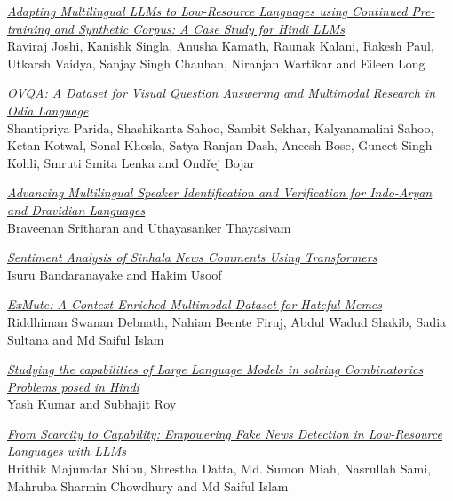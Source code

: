 \hyperlink{page.77}{\em Adapting Multilingual LLMs to Low-Resource Languages using Continued Pre-training and Synthetic Corpus: A Case Study for Hindi LLMs}\samepage \\
\hspace*{7mm} Raviraj Joshi, Kanishk Singla, Anusha Kamath, Raunak Kalani, Rakesh Paul, Utkarsh Vaidya, Sanjay Singh Chauhan, Niranjan Wartikar and Eileen Long\dotfill {}

\hyperlink{page.85}{\em OVQA: A Dataset for Visual Question Answering and Multimodal Research in Odia Language}\samepage \\
\hspace*{7mm} Shantipriya Parida, Shashikanta Sahoo, Sambit Sekhar, Kalyanamalini Sahoo, Ketan Kotwal, Sonal Khosla, Satya Ranjan Dash, Aneesh Bose, Guneet Singh Kohli, Smruti Smita Lenka and Ondřej Bojar\dotfill {}

\hyperlink{page.93}{\em Advancing Multilingual Speaker Identification and Verification for Indo-Aryan and Dravidian Languages}\samepage \\
\hspace*{7mm} Braveenan Sritharan and Uthayasanker Thayasivam\dotfill {}

\hyperlink{page.100}{\em Sentiment Analysis of Sinhala News Comments Using Transformers}\samepage \\
\hspace*{7mm} Isuru Bandaranayake and Hakim Usoof\dotfill {}

\hyperlink{page.109}{\em ExMute: A Context-Enriched Multimodal Dataset for Hateful Memes}\samepage \\
\hspace*{7mm} Riddhiman Swanan Debnath, Nahian Beente Firuj, Abdul Wadud Shakib, Sadia Sultana and Md Saiful Islam\dotfill {}

\hyperlink{page.116}{\em Studying the capabilities of Large Language Models in solving Combinatorics Problems posed in Hindi}\samepage \\
\hspace*{7mm} Yash Kumar and Subhajit Roy\dotfill {}

\hyperlink{page.126}{\em From Scarcity to Capability: Empowering Fake News Detection in Low-Resource Languages with LLMs}\samepage \\
\hspace*{7mm} Hrithik Majumdar Shibu, Shrestha Datta, Md. Sumon Miah, Nasrullah Sami, Mahruba Sharmin Chowdhury and Md Saiful Islam\dotfill {}

